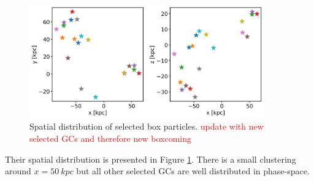 \begin{figure}[htbp]
\captionsetup{format=plain}
    \centering
    \includegraphics[width=0.9\textwidth]{plots/Dynamics/dist/progenitor2_box_distribution.png}
    \caption{Spatial distribution of selected box particles. \textcolor{red}{update with new selected GCs and therefore new boxcoming}}
    \label{fig:box_GCs_distr}
\end{figure}

Their spatial distribution is presented in Figure \ref{fig:box_GCs_distr}. There is a small clustering around $x = \SI{50}{kpc}$ but all other selected GCs are well distributed in phase-space. 


